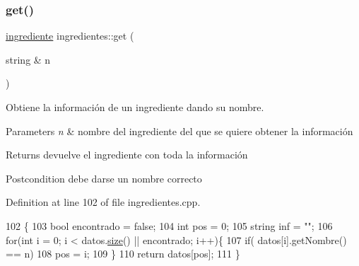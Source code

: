 \mbox{\label{classingredientes_a920e0fbbf533a8ba934cfc485b2e44c0}} 
\subsubsection{\texorpdfstring{get()}{get()}}
{\footnotesize\ttfamily \hyperlink{classingrediente}{ingrediente} ingredientes\+::get (\begin{DoxyParamCaption}\item[{string \&}]{n }\end{DoxyParamCaption})}



Obtiene la información de un ingrediente dando su nombre. 


\begin{DoxyParams}{Parameters}
{\em n} & nombre del ingrediente del que se quiere obtener la información \\
\hline
\end{DoxyParams}
\begin{DoxyReturn}{Returns}
devuelve el ingrediente con toda la información 
\end{DoxyReturn}
\begin{DoxyPostcond}{Postcondition}
debe darse un nombre correcto 
\end{DoxyPostcond}


Definition at line 102 of file ingredientes.\+cpp.


\begin{DoxyCode}
102                                       \{
103     \textcolor{keywordtype}{bool} encontrado = \textcolor{keyword}{false};
104     \textcolor{keywordtype}{int} pos = 0;
105     \textcolor{keywordtype}{string} inf = \textcolor{stringliteral}{""};
106     \textcolor{keywordflow}{for}(\textcolor{keywordtype}{int} i = 0; i < datos.\hyperlink{classVD_a411ad026db1c8e0617d9031f1f1017a5}{size}() || encontrado; i++)\{
107         \textcolor{keywordflow}{if}( datos[i].getNombre() == n)
108             pos = i;
109     \}
110     \textcolor{keywordflow}{return} datos[pos];
111 \}
\end{DoxyCode}
\mbox{\label{classingredientes_a160ecb07facb16cbe7369ea797c67549}} 

